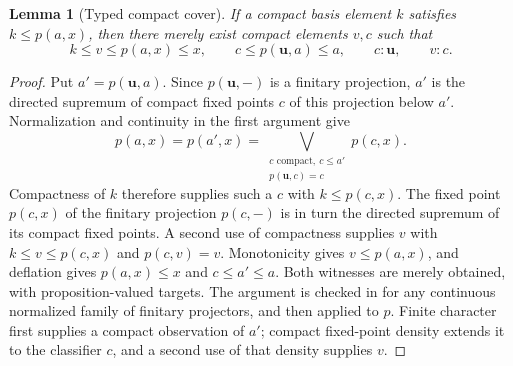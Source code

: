 \documentclass[11pt,a4paper]{article}
\newtheorem{lemma}[theorem]{Lemma}
\theoremstyle{definition}
\theoremstyle{remark}
\begin{document}
\begin{lemma}[Typed compact cover]\label{lem:typed-cover}
If a compact basis element $k$ satisfies $k\leq p(a,x)$, then there
merely exist compact elements $v,c$ such that
\[
 k\leq v\leq p(a,x)\leq x,\qquad c\leq p(\mathbf u,a)\leq a,\qquad
 c:\mathbf u,\qquad v:c.
\]
\end{lemma}
\begin{proof}
Put $a'=p(\mathbf u,a)$. Since $p(\mathbf u,-)$ is a finitary
projection, $a'$ is the directed supremum of compact fixed points $c$
of this projection below $a'$. Normalization and continuity in the first
argument give
\[
 p(a,x)=p(a',x)
 =\bigvee_{\substack{c\text{ compact},\ c\leq a'\\p(\mathbf u,c)=c}}p(c,x).
\]
Compactness of $k$ therefore supplies such a $c$ with $k\leq p(c,x)$.
The fixed point $p(c,x)$ of the finitary projection $p(c,-)$ is in turn
the directed supremum of its compact fixed points. A second use of
compactness supplies $v$ with $k\leq v\leq p(c,x)$ and $p(c,v)=v$.
Monotonicity gives $v\leq p(a,x)$, and deflation gives $p(a,x)\leq x$
and $c\leq a'\leq a$.
Both witnesses are merely obtained, with proposition-valued targets.
The argument is checked in  for any
continuous normalized family of finitary projectors, and then applied to
$p$. Finite character first supplies a compact observation of $a'$;
compact fixed-point density extends it to the classifier $c$, and a
second use of that density supplies $v$.
\end{proof}
\end{document}

